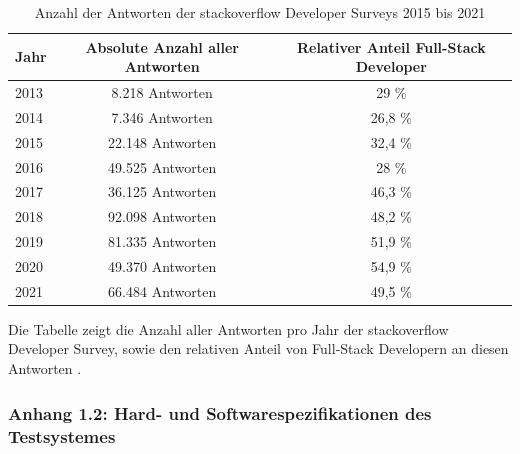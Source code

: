 \documentclass[a4paper]{scrartcl}
\begin{document}
\begin{table}[H]
	\centering
	\caption{Anzahl der Antworten der stackoverflow Developer Surveys 2015 bis 2021}
	\begin{center}
		\begin{tabular}{| l | c | c |}
			\hline
			Jahr & Absolute Anzahl aller Antworten & Relativer Anteil Full-Stack Developer \\
			\hline \hline
			2013 & 8.218 Antworten & 29 \% \\
			\hline
			2014 & 7.346 Antworten & 26,8 \% \\
			\hline
			2015 & 22.148 Antworten & 32,4 \% \\
			\hline 
			2016 & 49.525 Antworten & 28 \% \\
			\hline 
			2017 & 36.125 Antworten & 46,3 \% \\
			\hline 
			2018 & 92.098 Antworten & 48,2 \% \\
			\hline
			2019 & 81.335 Antworten & 51,9 \% \\
			\hline
			2020 & 49.370 Antworten & 54,9 \% \\
			\hline
			2021 & 66.484 Antworten & 49,5 \% \\
			\hline
		\end{tabular}
	\end{center}
	Die Tabelle zeigt die Anzahl aller Antworten pro Jahr der stackoverflow Developer Survey, sowie den relativen Anteil von Full-Stack Developern an diesen Antworten \autocite{stackoverflow_2015,stackoverflow_2016,stackoverflow_2017,stackoverflow_2018,stackoverflow_2019,stackoverflow_2020,stackoverflow_2021}.
\end{table}

\newpage

\subsubsection*{Anhang 1.2: Hard- und Softwarespezifikationen des Testsystemes}
\end{document}
